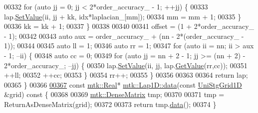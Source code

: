 \begin{DoxyCode}
00332     \textcolor{keywordflow}{for} (\textcolor{keyword}{auto} jj = 0; jj < 2*order\_accuracy\_ - 1; ++jj) \{
00333       lap.\hyperlink{classmtk_1_1DenseMatrix_a784ce5784109ac86bfb9d8562b334b13}{SetValue}(ii, jj + kk, idx*laplacian\_[mm]);
00334       mm = mm + 1;
00335     \}
00336     kk = kk + 1;
00337   \}
00338 
00340 
00341   offset = (1 + 2*order\_accuracy\_ - 1);
00342 
00343   \textcolor{keyword}{auto} aux = order\_accuracy\_ + (nn - 2*(order\_accuracy\_ - 1));
00344 
00345   \textcolor{keyword}{auto} ll = 1;
00346   \textcolor{keyword}{auto} rr = 1;
00347   \textcolor{keywordflow}{for} (\textcolor{keyword}{auto} ii = nn; ii > aux - 1; --ii) \{
00348     \textcolor{keyword}{auto} cc = 0;
00349     \textcolor{keywordflow}{for} (\textcolor{keyword}{auto} jj = nn + 2 - 1; jj >= (nn + 2) - 2*order\_accuracy\_; --jj) \{
00350       lap.\hyperlink{classmtk_1_1DenseMatrix_a784ce5784109ac86bfb9d8562b334b13}{SetValue}(ii, jj, lap.\hyperlink{classmtk_1_1DenseMatrix_a4b23ecbebd970b5eea915dbb50691024}{GetValue}(rr,cc));
00351       ++ll;
00352       ++cc;
00353     \}
00354     rr++;
00355   \}
00356 
00363 
00364   \textcolor{keywordflow}{return} lap;
00365 \}
00366 
\hypertarget{mtk__lap__1d_8cc_source_l00367}{}\hyperlink{classmtk_1_1Lap1D_ab2652725a8407c79247680c7bbd073b8}{00367} \textcolor{keyword}{const} \hyperlink{group__c01-roots_gac080bbbf5cbb5502c9f00405f894857d}{mtk::Real}* \hyperlink{classmtk_1_1Lap1D_ab2652725a8407c79247680c7bbd073b8}{mtk::Lap1D::data}(\textcolor{keyword}{const} \hyperlink{classmtk_1_1UniStgGrid1D}{UniStgGrid1D} &grid)\textcolor{keyword}{ const }\{
00368 
00369   \hyperlink{classmtk_1_1DenseMatrix}{mtk::DenseMatrix} tmp;
00370 
00371   tmp = ReturnAsDenseMatrix(grid);
00372 
00373   \textcolor{keywordflow}{return} tmp.\hyperlink{classmtk_1_1DenseMatrix_a0c33b8a9e01d157c61ddbdf807c25d84}{data}();
00374 \}
\end{DoxyCode}
